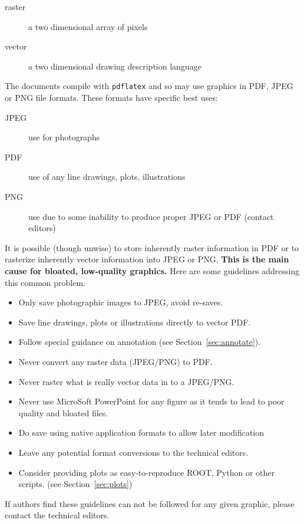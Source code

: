 \begin{description}
\item[raster] a two dimensional array of pixels
\item[vector] a two dimensional drawing description language
\end{description}

The documents compile with \texttt{pdflatex} and so may use graphics
in PDF, JPEG or PNG file formats.
These formats have specific best uses:

\begin{description}
\item[JPEG] use for photographs
\item[PDF] use of any line drawings, plots, illustrations
\item[PNG] use due to some inability to produce proper JPEG or PDF (contact editors)
\end{description}

It is possible (though unwise) to store inherently raster information
in PDF or to rasterize inherently vector information into JPEG or PNG.
\textbf{This is the main cause for bloated, low-quality graphics.}
Here are some guidelines addressing this common problem:

\begin{itemize}
\item Only save photographic images to JPEG, avoid re-saves.
\item Save line drawings, plots or illustrations directly to vector PDF.
\item Follow special guidance on annotation (see Section~\ref{sec:annotate}).
\item Never convert any raster data (JPEG/PNG) to PDF.
\item Never raster what is really vector data in to a JPEG/PNG.
\item Never use MicroSoft PowerPoint for any figure as it tends to lead to poor quality and bloated files.
\item Do save using native application formats to allow later
  modification
\item Leave any potential format conversions to the technical editors.
\item Consider providing plots as easy-to-reproduce ROOT, Python or
  other scripts.
  (see Section~\ref{sec:plots})
\end{itemize}

\noindent If authors find these guidelines can not be followed for any
given graphic, please contact the technical editors.   

